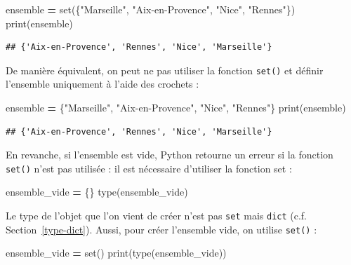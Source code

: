 \documentclass[12pt,]{book}
\newenvironment{Shaded}{\begin{snugshade}}{\end{snugshade}}
\newcommand{\StringTok}[1]{\textcolor[rgb]{0.31,0.60,0.02}{#1}}
\newcommand{\OperatorTok}[1]{\textcolor[rgb]{0.81,0.36,0.00}{\textbf{#1}}}
\newcommand{\BuiltInTok}[1]{#1}
\newcommand{\NormalTok}[1]{#1}
\numberwithin{equation}{section}
\numberwithin{countremarque}{section}
\begin{document}
\begin{Shaded}
\begin{Highlighting}[]
\NormalTok{ensemble }\OperatorTok{=} \BuiltInTok{set}\NormalTok{(\{}\StringTok{"Marseille"}\NormalTok{, }\StringTok{"Aix-en-Provence"}\NormalTok{, }\StringTok{"Nice"}\NormalTok{, }\StringTok{"Rennes"}\NormalTok{\})}
\BuiltInTok{print}\NormalTok{(ensemble)}
\end{Highlighting}
\end{Shaded}

\begin{lstlisting}
## {'Aix-en-Provence', 'Rennes', 'Nice', 'Marseille'}
\end{lstlisting}

De manière équivalent, on peut ne pas utiliser la fonction
\texttt{set()} et définir l'ensemble uniquement à l'aide des crochets :

\begin{Shaded}
\begin{Highlighting}[]
\NormalTok{ensemble }\OperatorTok{=}\NormalTok{ \{}\StringTok{"Marseille"}\NormalTok{, }\StringTok{"Aix-en-Provence"}\NormalTok{, }\StringTok{"Nice"}\NormalTok{, }\StringTok{"Rennes"}\NormalTok{\}}
\BuiltInTok{print}\NormalTok{(ensemble)}
\end{Highlighting}
\end{Shaded}

\begin{lstlisting}
## {'Aix-en-Provence', 'Rennes', 'Nice', 'Marseille'}
\end{lstlisting}

En revanche, si l'ensemble est vide, Python retourne un erreur si la
fonction \texttt{set()} n'est pas utilisée : il est nécessaire
d'utiliser la fonction set :

\begin{Shaded}
\begin{Highlighting}[]
\NormalTok{ensemble_vide }\OperatorTok{=}\NormalTok{ \{\}}
\BuiltInTok{type}\NormalTok{(ensemble_vide)}
\end{Highlighting}
\end{Shaded}

Le type de l'objet que l'on vient de créer n'est pas \texttt{set} mais
\texttt{dict} (c.f. Section~\ref{type-dict}). Aussi, pour créer
l'ensemble vide, on utilise \texttt{set()} :

\begin{Shaded}
\begin{Highlighting}[]
\NormalTok{ensemble_vide }\OperatorTok{=} \BuiltInTok{set}\NormalTok{()}
\BuiltInTok{print}\NormalTok{(}\BuiltInTok{type}\NormalTok{(ensemble_vide))}
\end{Highlighting}
\end{Shaded}
\end{document}
